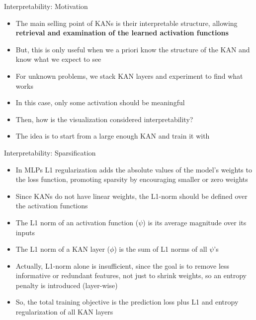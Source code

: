 \begin{frame}{Interpretability: Motivation}
    \begin{itemize}
        \item The main selling point of KANs is their interpretable structure, allowing \textbf{retrieval and examination of the learned activation functions} \vspace{0.5em}
        \item But, this is only useful when we a priori know the structure of the KAN and know what we expect to see \vspace{0.5em}
        \item For unknown problems, we stack KAN layers and experiment to find what works \vspace{0.5em}
        \item In this case, only some activation should be meaningful \vspace{0.5em}
        \item Then, how is the visualization considered interpretability? \vspace{0.5em}
        \item The idea is to start from a large enough KAN and train it with 
    \end{itemize}
\end{frame}

\begin{frame}{Interpretability: Sparsification}
    \begin{itemize}
        \item In MLPs L1 regularization adds the absolute values of the model's weights to the loss function, promoting sparsity by encouraging smaller or zero weights \vspace{0.5em}
        \item Since KANs do not have linear weights, the L1-norm should be defined over the activation functions \vspace{0.5em}
        \item The L1 norm of an activation function ($\psi$) is its average magnitude over its inputs \vspace{0.5em}
        \item The L1 norm of a KAN layer ($\phi$) is the sum of L1 norms of all $\psi$'s \vspace{0.5em}
        \item Actually, L1-norm alone is insufficient, since the goal is to remove less informative or redundant features, not just to shrink weights, so an entropy penalty is introduced (layer-wise)\vspace{0.5em}
        \item So, the total training objective is the prediction loss plus L1 and entropy regularization of all KAN layers \vspace{0.5em}
    \end{itemize}
\end{frame}

